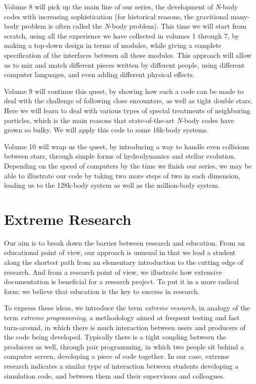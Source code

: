 Volume 8 will pick up the main line of our series, the development of
{\it N}-body codes with increasing sophistication (for historical
reasons, the gravitional many-body problem is often called the
{\it N}-body problem).  This time we will start from scratch, using all
the experience we have collected in volumes 1 through 7, by making a
top-down design in terms of modules, while giving a complete
specification of the interfaces between all these modules.  This
approach will allow us to mix and match different pieces written by
different people, using different computer languages, and even adding
different physical effects.

Volume 9 will continue this quest, by showing how such a code can be
made to deal with the challenge of following close encounters, as well
as tight double stars.  Here we will learn to deal with various types
of special treatments of neighboring particles, which is the main
reasons that state-of-the-art {\it N}-body codes have grown so bulky.
We will apply this code to some 16k-body systems.

Volume 10 will wrap us the quest, by introducing a way to handle even
collisions between stars, through simple forms of hydrodynamics and
stellar evolution.  Depending on the speed of computers by the time we
finish our series, we may be able to illustrate our code by taking two
more steps of two in each dimension, leading us to the 128k-body system
as well as the million-body system.

\section*{Extreme Research}

Our aim is to break down the barrier between research and education.
From an educational point of view, our approach is unusual in that we
lead a student along the shortest path from an elementary introduction
to the cutting edge of research.  And from a research point of view,
we illustrate how extensive documentation is beneficial for a research
project.  To put it in a more radical form: we believe that education
is the key to success in research.

To express these ideas, we introduce the term {\it extreme research},
in analogy of the term {\it extreme programming}, a methodology aimed
at frequent testing and fast turn-around, in which there is much
interaction between users and producers of the code being developed.
Typically there is a tight coupling between the producers as well,
through pair programming, in which two people sit behind a computer
screen, developing a piece of code together.  In our case, extreme
research indicates a similar type of interaction between students
developing a simulation code, and between them and their supervisors
and colleagues.

